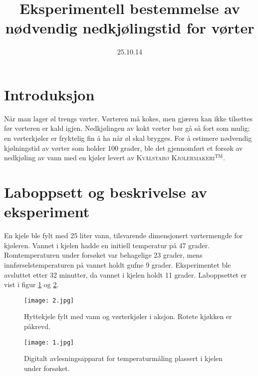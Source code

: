 \documentclass[a4paper]{article}
\title{Eksperimentell bestemmelse av nødvendig nedkjølingstid for vørter}
\date{25.10.14}
\begin{document}
\maketitle

\section{Introduksjon}
Når man lager øl trengs vørter. Vørteren må kokes, men gjæren kan ikke tilsettes før vørteren er kald igjen. Nedkjølingen av kokt vørter bør gå så fort som mulig; en vørterkjøler er fryktelig fin å ha når øl skal brygges. For å estimere nødvendig kjølningstid av vørter som holder 100 grader, ble det gjennomført et forsøk av nedkjøling av vann med en kjøler levert av {\textsc{Kvålstabø Kjølermakeri}$^{\text{TM}}$}.

\section{Laboppsett og beskrivelse av eksperiment}
En kjele ble fylt med 25 liter vann, tilsvarende dimensjonert vørtermengde for kjøleren. Vannet i kjelen hadde en initiell temperatur på 47 grader. Romtemperaturen under forsøket var behagelige 23 grader, mens innførselstemperaturen på vannet holdt gufne 9 grader. Eksperimentet ble avsluttet etter 32 minutter, da vannet i kjelen holdt 11 grader. Laboppsettet er vist i figur \ref{fig:Foto1} og \ref{fig:Foto2}.

\begin{figure}
\centering
\texttt{[image: 2.jpg]}
\caption{Hyttekjele fylt med vann og vørterkjøler i aksjon. Rotete kjøkken er påkrevd.}
\label{fig:Foto1}
\end{figure}

\begin{figure}
\centering
\texttt{[image: 1.jpg]}
\caption{Digitalt avlesningsapparat for temperaturmåling plassert i kjelen under forsøket.}
\label{fig:Foto2}
\end{figure}
\end{document}
